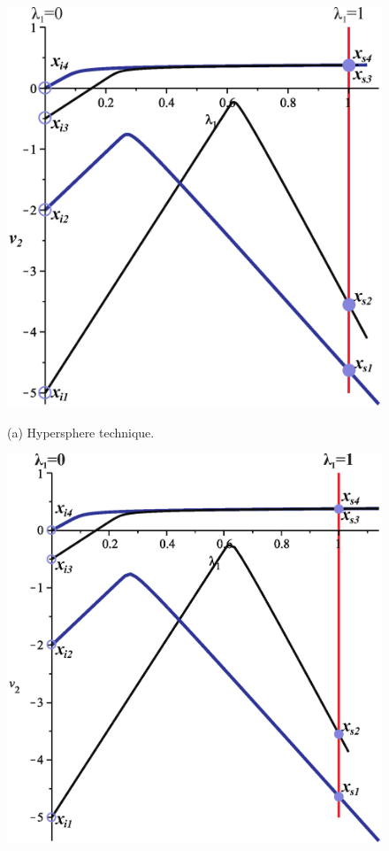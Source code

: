 \documentclass[conference,letterpaper,onecolumn]{IEEEtran}
\begin{document}
\begin{figure}[!hbtp]
\centering
\begin{minipage}{\linewidth}
\centering
	\includegraphics[scale=0.42]{fig/curvasesfera.eps}
\end{minipage}
\newline
\begin{minipage}{\linewidth}
\centering
(a) Hypersphere technique.
\end{minipage}
\newline
\newline
\begin{minipage}{\linewidth}
\centering
	\includegraphics[scale=0.42]{fig/curvascirculo.eps}

\end{minipage}
\end{figure}
\end{document}
